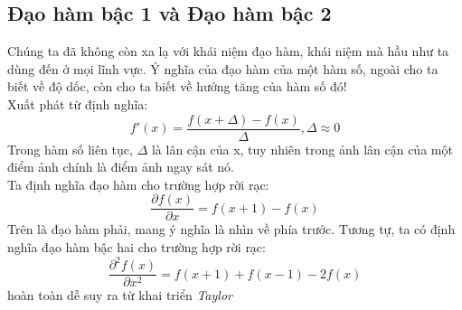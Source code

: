 \documentclass{article}
\begin{document}
    \subsection{Đạo hàm bậc 1 và Đạo hàm bậc 2}
    Chúng ta đã không còn xa lạ với khái niệm đạo hàm, khái niệm mà hầu như ta dùng đến ở mọi lĩnh vực. Ý nghĩa của đạo hàm của một hàm số, ngoài cho ta biết về độ dốc, còn cho ta biết về hướng tăng của hàm số đó!\\
    Xuất phát từ định nghĩa:
    $$ f'(x) = \frac{f(x+\Delta) - f(x)}{\Delta}, \Delta \approx 0$$
    Trong hàm số liên tục, $\Delta$ là lân cận của x, tuy nhiên trong ảnh lân cận của một điểm ảnh chính là điểm ảnh ngay sát nó.\\ 
    Ta định nghĩa đạo hàm cho trường hợp rời rạc:
    $$ \frac{\partial f(x)}{\partial x} = f(x+1) - f(x)$$
    Trên là đạo hàm phải, mang ý nghĩa là nhìn về phía trước.
    Tương tự, ta có định nghĩa đạo hàm bậc hai cho trường hợp rời rạc:
    $$ \frac{\partial^2 f(x)}{\partial x^2} = f(x+1) + f(x-1) - 2f(x)$$
    hoàn toàn dễ suy ra từ khai triển \textit{Taylor}
\end{document}
